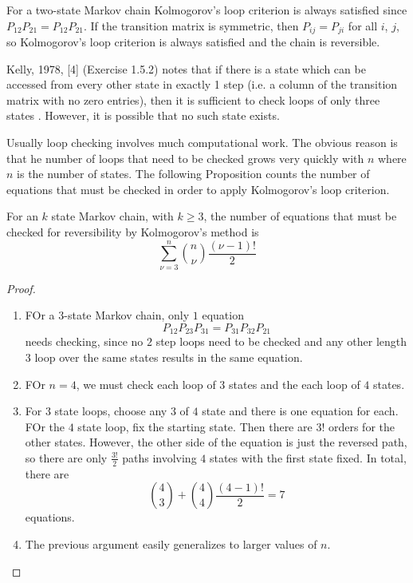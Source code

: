 \documentclass[12pt]{article}
\begin{document}
For a two-state Markov chain Kolmogorov's loop criterion is always
satisfied since $P_{12} P_{21} = P_{12} P_{21}$.  If the transition
matrix is symmetric, then $P_{ij} = P_{ji}$ for all $i$, $j$, so
Kolmogorov's loop criterion is always satisfied and the chain is
reversible.  

Kelly, 1978, [4] (Exercise 1.5.2) notes that
if there is a state which can be accessed from every other state in exactly 1 step
(i.e. a column of the transition matrix with no zero entries), then it is sufficient to
check loops of only three states . However, it is possible that no
such state exists.

Usually loop checking involves much computational work.  The obvious
reason is that he number of loops that need
to be checked grows very quickly with $n$ where $n$ is the number of states. 
The following Proposition counts the number of equations that must be checked in order to
apply Kolmogorov’s loop criterion.

\begin{proposition}
For an $k$ state Markov chain, with $k \ge 3$, the number of
equations that must be checked for reversibility by Kolmogorov’s method is
\[
  \sum_{\nu=3}^n \binom{n}{\nu} \frac{(\nu-1)!}{2}
\]
\end{proposition}

\begin{proof}
  \begin{enumerate}
  \item FOr a $3$-state Markov chain, only $1$ equation
    \[
      P_{12}P_{23}P_{31} = P_{31} P_{32} P_{21}
    \]
    needs checking, since no $2$ step loops need to be checked and any
    other length $3$ loop over the same states results in the same
    equation.
  \item FOr $n=4$, we must check each loop of $3$ states and the each
    loop of $4$ states.
  \item For $3$ state loops, choose any $3$ of $4$ state and there is
    one equation for each.  FOr the $4$ state loop, fix the starting
    state.  Then there are $3!$ orders for the other states.  However,
     the other side of the equation is just the reversed path, so
     there are only $\frac{3!}{2}$ paths involving $4$ states with the
     first state fixed.  In total, there are
     \[
       \binom{4}{3} + \binom{4}{4} \frac{(4-1)!}{2} = 7
     \]
     equations.
   \item The previous argument easily generalizes to larger values of $n$.
  \end{enumerate}
\end{proof}
\end{document}
